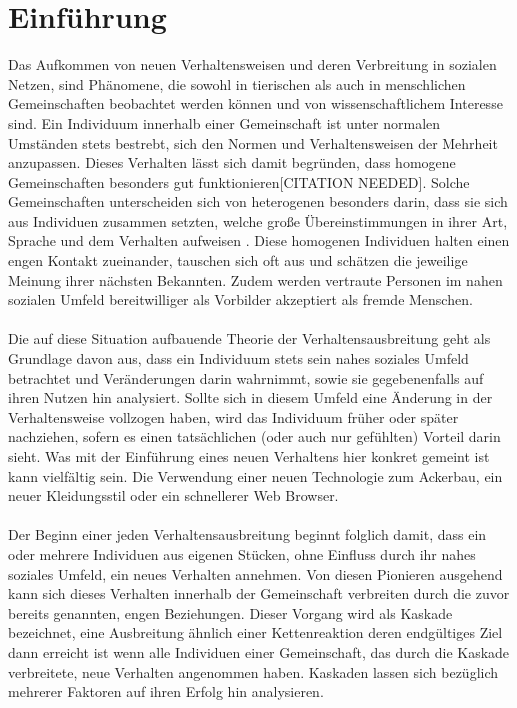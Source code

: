 \documentclass[12pt]{article}
\begin{document}
\section{Einführung}
Das Aufkommen von neuen Verhaltensweisen und deren Verbreitung in sozialen Netzen, sind Phänomene, die sowohl in tierischen als auch in menschlichen Gemeinschaften beobachtet werden können und von wissenschaftlichem Interesse sind. Ein Individuum innerhalb einer Gemeinschaft ist unter normalen Umständen stets bestrebt, sich den Normen und Verhaltensweisen der Mehrheit anzupassen. Dieses Verhalten lässt sich damit begründen, dass homogene Gemeinschaften besonders gut funktionieren[CITATION NEEDED]. Solche Gemeinschaften unterscheiden sich von heterogenen besonders darin, dass sie sich aus Individuen zusammen setzten, welche große Übereinstimmungen in ihrer Art, Sprache und dem Verhalten aufweisen \cite{Rogers03}. Diese homogenen Individuen halten einen engen Kontakt zueinander, tauschen sich oft aus und schätzen die jeweilige Meinung ihrer nächsten Bekannten. Zudem werden vertraute Personen im nahen sozialen Umfeld bereitwilliger als Vorbilder akzeptiert als fremde Menschen.\\\\
Die auf diese Situation aufbauende Theorie der Verhaltensausbreitung geht als Grundlage davon aus, dass ein Individuum stets sein nahes soziales Umfeld betrachtet und Veränderungen darin wahrnimmt, sowie sie gegebenenfalls auf ihren Nutzen hin analysiert. Sollte sich in diesem Umfeld eine Änderung in der Verhaltensweise vollzogen haben, wird das Individuum früher oder später nachziehen, sofern es einen tatsächlichen (oder auch nur gefühlten) Vorteil darin sieht. Was mit der Einführung eines neuen Verhaltens hier konkret gemeint ist kann vielfältig sein. Die Verwendung einer neuen Technologie zum Ackerbau, ein neuer Kleidungsstil oder ein schnellerer Web Browser.\\\\
Der Beginn einer jeden Verhaltensausbreitung beginnt folglich damit, dass ein oder mehrere Individuen aus eigenen Stücken, ohne Einfluss durch ihr nahes soziales Umfeld, ein neues Verhalten annehmen. Von diesen Pionieren ausgehend kann sich dieses Verhalten innerhalb der Gemeinschaft verbreiten durch die zuvor bereits genannten, engen Beziehungen. Dieser Vorgang wird als Kaskade bezeichnet, eine Ausbreitung ähnlich einer Kettenreaktion deren endgültiges Ziel dann erreicht ist wenn alle Individuen einer Gemeinschaft, das durch die Kaskade verbreitete, neue Verhalten angenommen haben.
Kaskaden lassen sich bezüglich mehrerer Faktoren auf ihren Erfolg hin analysieren.
\end{document}
